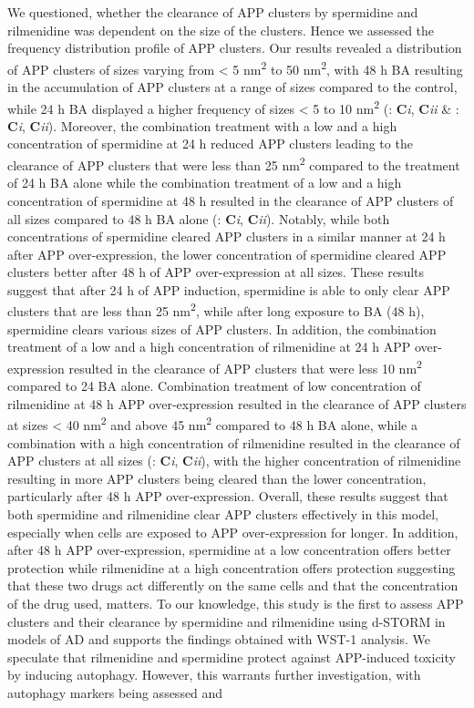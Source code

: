 We questioned, whether the clearance of APP clusters by spermidine and rilmenidine was dependent on the size of the clusters. Hence we assessed the frequency distribution profile of APP clusters. Our results revealed a distribution of APP clusters of sizes varying from < 5 nm\textsuperscript{2} to 50 nm\textsuperscript{2}, with 48 h BA resulting in the accumulation of APP clusters at a range of sizes compared to the control, while 24 h BA displayed a higher frequency of sizes < 5 to 10 nm\textsuperscript{2} (: \textbf{C}\textit{i}, \textbf{C}\textit{ii} \& : \textbf{C}\textit{i}, \textbf{C}\textit{ii}). Moreover, the combination treatment with a low and a high concentration of spermidine at 24 h reduced APP clusters leading to the clearance of APP clusters that were less than 25 nm\textsuperscript{2} compared to the treatment of 24 h BA alone while the combination treatment of a low and a high concentration of spermidine at 48 h resulted in the clearance of APP clusters of all sizes compared to 48 h BA alone (: \textbf{C}\textit{i}, \textbf{C}\textit{ii}). Notably, while both concentrations of spermidine cleared APP clusters in a similar manner at 24 h after APP over-expression, the lower concentration of spermidine cleared APP clusters better after 48 h of APP over-expression at all sizes. These results suggest that after 24 h of APP induction, spermidine is able to only clear APP clusters that are less than 25 nm\textsuperscript{2}, while after long exposure to BA (48 h), spermidine clears various sizes of APP clusters. In addition, the combination treatment of a low and a high concentration of rilmenidine at 24 h APP over-expression resulted in the clearance of APP clusters that were less 10 nm\textsuperscript{2} compared to  24 BA alone. Combination treatment of low concentration of rilmenidine at 48 h APP over-expression resulted in the clearance of APP clusters at sizes < 40 nm\textsuperscript{2} and above 45  nm\textsuperscript{2} compared to 48 h BA alone, while a combination with a high concentration of rilmenidine resulted in the clearance of APP clusters at all sizes (: \textbf{C}\textit{i}, \textbf{C}\textit{ii}), with the higher concentration of rilmenidine resulting in more APP clusters being cleared than the lower concentration, particularly after 48 h APP over-expression. Overall, these results suggest that both spermidine and rilmenidine clear APP clusters effectively in this model, especially when cells are exposed to APP over-expression for longer. In addition, after 48 h APP over-expression, spermidine at a low concentration offers better protection while rilmenidine at a high concentration offers protection suggesting that these two drugs act differently on the same cells and that the concentration of the drug used, matters. To our knowledge, this study is the first to assess APP clusters and their clearance by spermidine and rilmenidine using d-STORM in models of AD and supports the findings obtained with WST-1 analysis. We speculate that rilmenidine and spermidine protect against APP-induced toxicity by inducing autophagy. However, this warrants further investigation, with autophagy markers being assessed and 